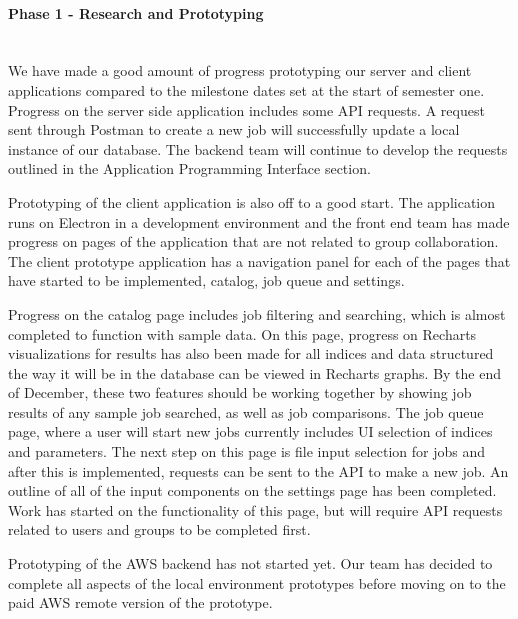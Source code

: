 \paragraph{Phase 1 - Research and Prototyping} \mbox{}\\[\paragraphheaderspace]
We have made a good amount of progress prototyping our server and client applications compared to the milestone dates set at the start of semester one. Progress on the server side application includes some API requests. A request sent through Postman to create a new job will successfully update a local instance of our database. The backend team will continue to develop the requests outlined in the Application Programming Interface section.\par
Prototyping of the client application is also off to a good start. The application runs on Electron in a development environment and the front end team has made progress on pages of the application that are not related to group collaboration. The client prototype application has a navigation panel for each of the pages that have started to be implemented, catalog, job queue and settings.\par
Progress on the catalog page includes job filtering and searching, which is almost completed to function with sample data. On this page, progress on Recharts visualizations for results has also been made for all indices and data structured the way it will be in the database can be viewed in Recharts graphs. By the end of December, these two features should be working together by showing job results of any sample job searched, as well as job comparisons. The job queue page, where a user will start new jobs currently includes UI selection of indices and parameters. The next step on this page is file input selection for jobs and after this is implemented, requests can be sent to the API to make a new job. An outline of all of the input components on the settings page has been completed. Work has started on the functionality of this page, but will require API requests related to users and groups to be completed first.\par
Prototyping of the AWS backend has not started yet. Our team has decided to complete all aspects of the local environment prototypes before moving on to the paid AWS remote version of the prototype.\par
